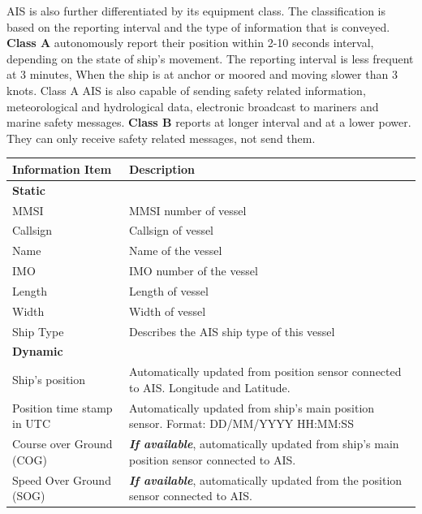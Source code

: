 AIS is also further differentiated by its equipment class. The classification is based on the reporting interval and the type of information that is conveyed. \textbf{Class A} autonomously report their position within 2-10 seconds interval, depending on the state of ship's movement. The reporting interval is less frequent at 3 minutes, When the ship is at anchor or moored and moving slower than 3 knots. Class A AIS is also capable of sending safety related information, meteorological and hydrological data, electronic broadcast to mariners and marine safety messages. \textbf{Class B} reports at longer interval and at a lower power. They can only receive safety related messages, not send them. \cite{Rakke2016,webimo.2014}\\
\begin{table}
    {\begin{tabular}{ |p{6cm}|p{9cm}|  }
    \hline
    \textbf{Information Item} & \textbf{Description} \\
    \hline
    \multicolumn{2}{|l|}{\textbf{Static}}\\
    \hline
    MMSI & MMSI number of vessel\\
    \hline
    Callsign & Callsign of vessel \\
    \hline
    Name & Name of the vessel \\
    \hline
    IMO & IMO number of the vessel \\
    \hline
    Length & Length of vessel \\
    \hline
    Width & Width of vessel \\
    \hline
    Ship Type & Describes the AIS ship type of this vessel \\
    \hline
    \multicolumn{2}{|l|}{\textbf{Dynamic}}\\
    \hline
    Ship's position & Automatically updated from position sensor connected to AIS. Longitude and Latitude.\\
    \hline
    Position time stamp in UTC & Automatically updated from ship's main position sensor. Format: DD\slash MM\slash YYYY HH:MM:SS\\
    \hline
    Course over Ground (COG) & \emph{\textbf{If available}}, automatically updated from ship's main position sensor connected to AIS.\\  
    \hline
    Speed Over Ground (SOG) & \emph{\textbf{If available}}, automatically updated from the position sensor connected to AIS.\\

\end{tabular}}
\end{table}
